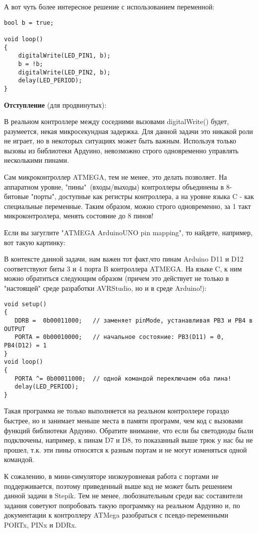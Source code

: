 А вот чуть более интересное решение с использованием переменной:

\begin{verbatim}
bool b = true;

void loop()
{
    digitalWrite(LED_PIN1, b);
    b = !b;
    digitalWrite(LED_PIN2, b);
    delay(LED_PERIOD); 
}
\end{verbatim}

\textbf{Отступление} (для продвинутых): 

В реальном контроллере между соседними вызовами digitalWrite() будет, разумеется, некая микросекундная задержка. Для данной задачи это никакой роли не играет, но в некоторых ситуациях может быть важным.  Используя только вызовы из библиотеки Ардуино, невозможно строго одновременно управлять несколькими пинами. 

Сам микроконтроллер ATMEGA, тем не менее, это делать позволяет.  На  аппаратном уровне, "пины"\ (входы/выходы) контроллеры объединены в 8-битовые "порты"{}, доступные как регистры контроллера, а на уровне языка C - как специальные переменные. Таким образом, можно строго одновременно, за 1 такт микроконтроллера, менять состояние до 8 пинов! 

Если вы загуглите "ATMEGA ArduinoUNO pin mapping", то найдете, например, вот такую картинку:


В контексте данной задачи, нам важен тот факт,что пинам Arduino D11 и D12 соответствуют биты 3 и 4 порта B контроллера ATMEGA. На языке C, к ним можно обратиться следующим образом (причем это действует не только в "настоящей" среде разработки AVRStudio, но и в среде Arduino!):

\begin{verbatim}
void setup()
{
   DDRB =  0b00011000;   // заменяет pinMode, устанавливая PB3 и PB4 в OUTPUT
   PORTA = 0b00010000;   // начальное состояние: PB3(D11) = 0, PB4(D12) = 1
}
void loop()
{
   PORTA ^= 0b00011000;  // одной командой переключаем оба пина!
   delay(LED_PERIOD); 
}
\end{verbatim}

Такая программа не только выполняется  на реальном контроллере гораздо быстрее, но и занимает меньше места в памяти программ, чем код с вызовами функций библиотеки Ардуино.  Обратите внимание, что если бы светодиоды были подключены, например, к пинам D7 и D8, то показанный выше трюк у нас бы не прошел, т.к. эти пины относятся к разным портам и не могут изменяться одной командой.

К сожалению, в мини-симуляторе низкоуровневая работа с портами не поддерживается, поэтому приведенный выше код не может быть решением данной задачи в Stepik.  Тем не менее,  любознательным среди вас составители задания советуют попробовать такую программку на реальном Ардуино и, по документации к контроллеру ATMega  разобраться с псевдо-переменными  PORTx, PINx и DDRx.
